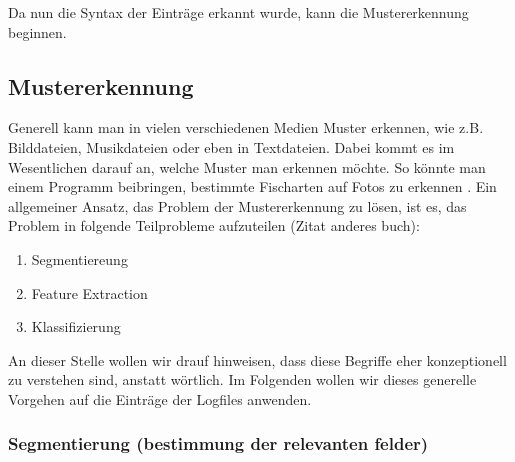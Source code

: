 Da nun die Syntax der Einträge erkannt wurde, kann die Mustererkennung beginnen.


\subsection{Mustererkennung}
\label{sub:Mustererkennung}
	Generell kann man in vielen verschiedenen Medien Muster erkennen, wie z.B. Bilddateien, Musikdateien oder eben in Textdateien. Dabei kommt es im Wesentlichen darauf an, welche Muster man erkennen möchte. So könnte man einem Programm beibringen, bestimmte Fischarten auf Fotos zu erkennen \citep{DuHaSt01}. Ein allgemeiner Ansatz, das Problem der Mustererkennung zu lösen, ist es, das Problem in folgende Teilprobleme aufzuteilen (Zitat anderes buch):
\begin{enumerate}
	\item Segmentiereung
	\item Feature Extraction
	\item Klassifizierung
\end{enumerate}
An dieser Stelle wollen wir drauf hinweisen, dass diese Begriffe eher konzeptionell zu verstehen sind, anstatt wörtlich. Im Folgenden wollen wir dieses generelle Vorgehen auf die Einträge der Logfiles anwenden. 

\subsubsection{Segmentierung (bestimmung der relevanten felder)}
\label{ssub:Segmentierung}

